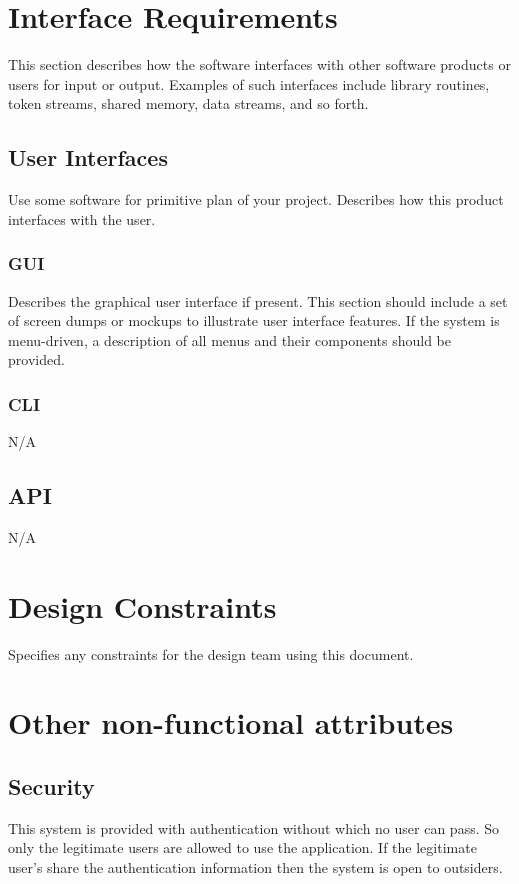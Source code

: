 \documentclass[]{article}
\begin{document}
\section{Interface Requirements}
This section describes how the software interfaces with other software products or users for input or output. Examples of such interfaces include library routines, token streams, shared memory, data streams, and so forth. 

\subsection{User Interfaces}
Use some software for primitive plan of your project.
Describes how this product interfaces with the user. 

\subsubsection {GUI}
Describes the graphical user interface if present. This section should include a set of screen dumps or mockups to illustrate user interface features. 
If the system is menu-driven, a description of all menus and their components should be provided. 

\subsubsection { CLI}
N/A

\subsection {API}
N/A


\section{Design Constraints}
Specifies any constraints for the design team using this document. 

\section{Other non-functional attributes}


\subsection {Security}
This system is provided with authentication without which no user can pass. So only the legitimate users are allowed to use the application. If the legitimate user’s share the authentication information then the system is open to outsiders.
\end{document}
